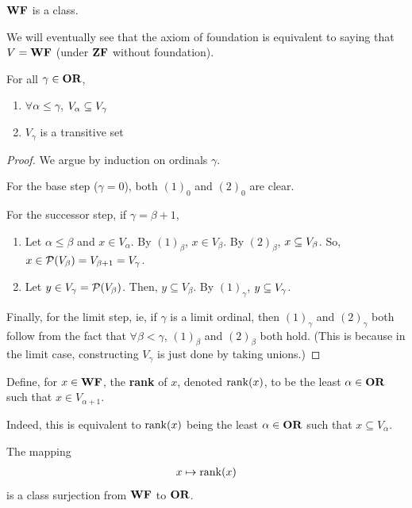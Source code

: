 $\mathbf{WF}$ is a class.

We will eventually see that the axiom of foundation is equivalent to saying that $V = \mathbf{WF}$ (under $\mathbf{ZF}$ without foundation).

\begin{boxproposition}
    For all $\gamma \in \mathbf{OR}$,
    \begin{enumerate}[label = $\parenth{\arabic*}_{\gamma}$]
        \item $\forall \alpha \leq \gamma$, $V_{\alpha} \subseteq V_{\gamma}$
        \item $V_{\gamma}$ is a transitive set
    \end{enumerate}
\end{boxproposition}
\begin{proof}
    We argue by induction on ordinals $\gamma$.

    For the base step ($\gamma = 0$), both $(1)_0$ and $(2)_0$ are clear.

    For the successor step, if $\gamma = \beta + 1$,
    \begin{enumerate}[label = $\parenth{\arabic*}_{\gamma}$]
        \item Let $\alpha \leq \beta$ and $x \in V_{\alpha}$. By $(1)_{\beta}$, $x \in V_{\beta}$. By $(2)_{\beta}$, $x \subseteq V_{\beta}$. So, $x \in \mathcal{P}\!\left( V_{\beta} \right) = V_{\beta + 1} = V_{\gamma}$.

        \item Let $y \in V_{\gamma} = \mathcal{P}\!\left( V_{\beta} \right)$. Then, $y \subseteq V_{\beta}$. By $(1)_{\gamma}$, $y \subseteq V_{\gamma}$.
    \end{enumerate}

    Finally, for the limit step, ie, if $\gamma$ is a limit ordinal, then $(1)_{\gamma}$ and $(2)_{\gamma}$ both follow from the fact that $\forall \beta < \gamma$, $(1)_{\beta}$ and $(2)_{\beta}$ both hold. (This is because in the limit case, constructing $V_{\gamma}$ is just done by taking unions.)
\end{proof}

\begin{boxdefinition}[Rank]\label{Ch1:Def:Rank}
    Define, for $x \in \mathbf{WF}$, the \textbf{rank} of $x$, denoted $\operatorname{rank}\!\left( x \right)$, to be the least $\alpha \in \mathbf{OR}$ such that $x \in V_{\alpha + 1}$.
\end{boxdefinition}

Indeed, this is equivalent to $\operatorname{rank}\!\left( x \right)$ being the least $\alpha \in \mathbf{OR}$ such that $x \subseteq V_{\alpha}$.

\begin{boxproposition}
    The mapping
    \begin{align*}
        x \mapsto \operatorname{rank}\!\left( x \right)
    \end{align*}
    is a class surjection from $\mathbf{WF}$ to $\mathbf{OR}$.
\end{boxproposition}

